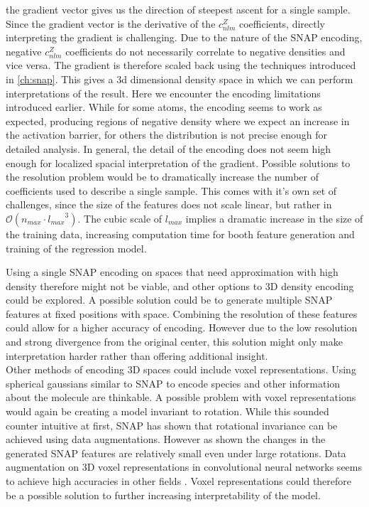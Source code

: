 the gradient vector gives us the direction of steepest ascent for a single sample.
Since the gradient vector is the derivative of the $c_{nlm}^Z$ coefficients, 
directly interpreting the gradient is challenging. 
Due to the nature of the SNAP encoding, negative $c_{nlm}^Z$ coefficients do not necessarily correlate to negative densities and vice versa.
The gradient is therefore scaled back using the techniques introduced in \ref{ch:snap}.
This gives a 3d dimensional density space in which we can perform interpretations of the result. %
Here we encounter the encoding limitations introduced earlier.
While for some atoms, the encoding seems to work as expected, producing regions of negative density where we expect
an increase in the activation barrier, for others the distribution is not precise enough for detailed analysis.
In general, the detail of the encoding does not seem high enough for localized spacial interpretation of the gradient.
Possible solutions to the resolution problem would be to dramatically increase the number of coefficients used to describe a single sample.
This comes with it's own set of challenges, since the size of the features does not scale linear, but rather in $\mathcal{O}(n_{max} \cdot {l_{max}}^3)$.
The cubic scale of $l_{max}$ implies a dramatic increase in the size of the training data, increasing computation time for booth feature generation and training of the regression model.

Using a single SNAP encoding on spaces that need approximation with high density therefore might not be viable, and other options to 3D density encoding could be explored.
A possible solution could be to generate multiple SNAP features at fixed positions with space.
Combining the resolution of these features could allow for a higher accuracy of encoding.
However due to the low resolution and strong divergence from the original center, 
this solution might only make interpretation harder rather than offering additional insight.
\\

Other methods of encoding 3D spaces could include voxel representations.
Using spherical gaussians similar to SNAP to encode species and other information about the molecule are thinkable.
A possible problem with voxel representations would again be creating a model invariant to rotation.
While this sounded counter intuitive at first, SNAP has shown that rotational invariance can be achieved using data augmentations.
However as shown the changes in the generated SNAP features are relatively small even under large rotations.
Data augmentation on 3D voxel representations in convolutional neural networks seems to achieve high accuracies in 
other fields \cite{7353481}.
Voxel representations could therefore be a possible solution to further increasing interpretability of the model.


